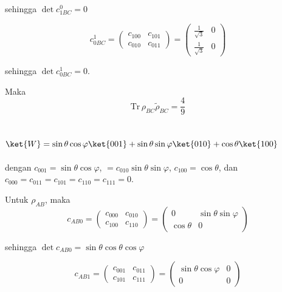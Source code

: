 sehingga $\det c_{1BC}^0 = 0$

\begin{equation}
	c_{0BC}^1=
	\begin{pmatrix}
		c_{100} & c_{101} \\
		c_{010} & c_{011}
	\end{pmatrix}=
	\begin{pmatrix}
		\frac{1}{\sqrt{3}} & 0 \\
		\frac{1}{\sqrt{3}} & 0
	\end{pmatrix}
\end{equation}

sehingga $\det c_{0BC}^1 = 0$.

Maka
\begin{equation}
	\mathrm{Tr}\,\rho_{BC}\tilde{\rho}_{BC}=\frac{4}{9}
\end{equation}

\subsection{ $\ket{W}=\sin\theta\cos\varphi\ket{001}+\sin\theta\sin\varphi\ket{010}+\cos\theta\ket{100}$}
dengan $c_{001}=\sin\theta\cos\varphi$, $=c_{010}\sin\theta\sin\varphi$, $c_{100}=\cos\theta$, dan $c_{000}=c_{011}=c_{101}=c_{110}=c_{111}=0$.

Untuk $\rho_{AB}$, maka
\begin{equation}
	c_{AB0}=
	\begin{pmatrix}
		c_{000} & c_{010} \\
		c_{100} & c_{110}
	\end{pmatrix}=
	\begin{pmatrix}
		0 & \sin\theta\sin\varphi \\
		\cos\theta & 0
	\end{pmatrix}
\end{equation}

sehingga $\det c_{AB0} = \sin\theta\cos\theta\cos\varphi$

\begin{equation}
	c_{AB1}=
	\begin{pmatrix}
		c_{001} & c_{011} \\
		c_{101} & c_{111}
	\end{pmatrix}=
	\begin{pmatrix}
		\sin\theta\cos\varphi & 0 \\
		0 & 0
	\end{pmatrix}
\end{equation}

